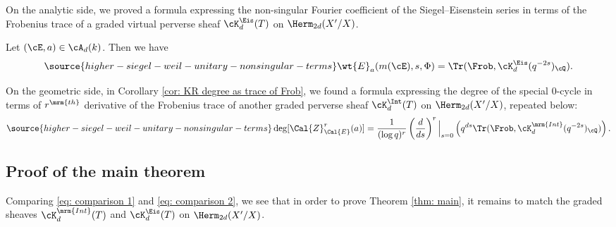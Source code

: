  On the analytic side, we proved a formula expressing the non-singular Fourier coefficient of the Siegel--Eisenstein series in terms of the Frobenius trace of a graded virtual perverse sheaf $\cK_{d}^{\Eis}(T)$ on $\Herm_{2d}(X'/X)$.

\begin{thm}
\notready Let $(\cE,a)\in \cA_{d}(k)$. Then we have
\label{thm:comparison-eisenstein-trace}
\begin{equation}\label{eq: comparison 1}
\source{higher-siegel-weil-unitary-nonsingular-terms}
\wt{E}_{a}(m(\cE),s,\Phi) =  \Tr(\Frob,\cK_{d}^{\Eis}(q^{-2s})_{\cQ}).
\end{equation}
\end{thm}


On the geometric side,  in Corollary \ref{cor: KR degree as trace of Frob}, we found a formula expressing the degree of the special $0$-cycle in terms of $r^{\mrm{th}}$ derivative of the Frobenius trace of another graded perverse sheaf $\cK^{\Int}_{d}(T)$ on $\Herm_{2d}(X'/X)$, repeated below:
\begin{equation}\label{eq: comparison 2}
\source{higher-siegel-weil-unitary-nonsingular-terms}
\deg [\Cal{Z}^{r}_{\Cal{E}}(a)] = \frac{1}{(\log q)^r} \left(\frac{d}{ds}\right)^r\Big|_{s=0} \left(q^{ds}\Tr(\Frob, \cK_d^{\mrm{Int}}(q^{-2s})_{\cQ})\right).
\end{equation}


\subsection{Proof of the main theorem} Comparing \eqref{eq: comparison 1} and \eqref{eq: comparison 2}, we see that in order to prove Theorem \ref{thm: main}, it remains to match the graded sheaves $\cK_d^{\mrm{Int}}(T)$ and $\cK_{d}^{\Eis}(T)$ on $\Herm_{2d}(X'/X)$.

